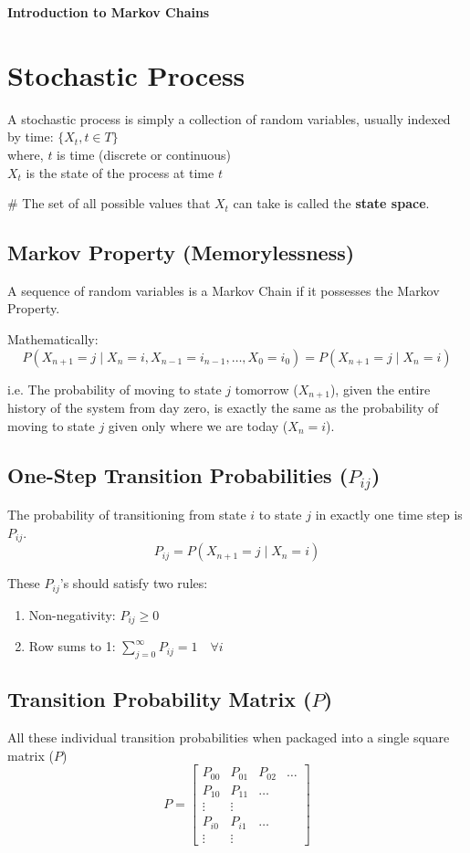 \begin{center}
    \Large\textbf{\textcolor{primary}{Introduction to Markov Chains}}
\end{center}
\vspace{0.5cm}

\section{\textcolor{secondary}{Stochastic Process}}
A stochastic process is simply a collection of random variables, usually indexed by time: $\{X_t, t \in T\}$\\
where, $t$ is time (discrete or continuous)\\
$X_t$ is the state of the process at time $t$

\# The set of all possible values that $X_t$ can take is called the \textbf{state space}.

\subsection{\textcolor{secondary}{Markov Property (Memorylessness)}}
A sequence of random variables is a Markov Chain if it possesses the Markov Property.

Mathematically:
\[ P(X_{n+1} = j \mid X_n = i, X_{n-1} = i_{n-1}, \dots, X_0 = i_0) = P(X_{n+1} = j \mid X_n = i) \]

i.e. The probability of moving to state $j$ tomorrow ($X_{n+1}$), given the entire history of the system from day zero, is exactly the same as the probability of moving to state $j$ given only where we are today ($X_n = i$).

\subsection{\textcolor{secondary}{One-Step Transition Probabilities ($P_{ij}$)}}
The probability of transitioning from state $i$ to state $j$ in exactly one time step is $P_{ij}$.
\[ P_{ij} = P(X_{n+1} = j \mid X_n = i) \]

These $P_{ij}$'s should satisfy two rules:
\begin{enumerate}
    \item Non-negativity: $P_{ij} \geq 0$
    \item Row sums to 1: $\sum_{j=0}^{\infty} P_{ij} = 1 \quad \forall i$
\end{enumerate}

\subsection{\textcolor{secondary}{Transition Probability Matrix ($P$)}}
All these individual transition probabilities when packaged into a single square matrix ($P$)
\[ P = \begin{bmatrix} P_{00} & P_{01} & P_{02} & \dots \\ P_{10} & P_{11} & \dots \\ \vdots & \vdots \\ P_{i0} & P_{i1} & \dots \\ \vdots & \vdots \end{bmatrix} \]

